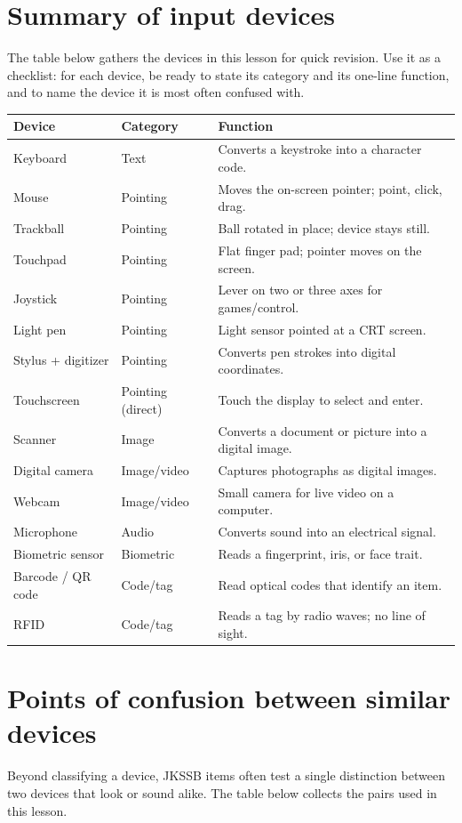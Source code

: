 \section{Summary of input devices}
The table below gathers the devices in this lesson for quick revision. Use it
as a checklist: for each device, be ready to state its category and its
one-line function, and to name the device it is most often confused with.

\begin{center}
\begin{tabular}{p{}p{}p{}}
\toprule
\textbf{Device} & \textbf{Category} & \textbf{Function} \\
\midrule
Keyboard & Text & Converts a keystroke into a character code. \\
Mouse & Pointing & Moves the on-screen pointer; point, click, drag. \\
Trackball & Pointing & Ball rotated in place; device stays still. \\
Touchpad & Pointing & Flat finger pad; pointer moves on the screen. \\
Joystick & Pointing & Lever on two or three axes for games/control. \\
Light pen & Pointing & Light sensor pointed at a CRT screen. \\
Stylus + digitizer & Pointing & Converts pen strokes into digital coordinates. \\
Touchscreen & Pointing (direct) & Touch the display to select and enter. \\
Scanner & Image & Converts a document or picture into a digital image. \\
Digital camera & Image/video & Captures photographs as digital images. \\
Webcam & Image/video & Small camera for live video on a computer. \\
Microphone & Audio & Converts sound into an electrical signal. \\
Biometric sensor & Biometric & Reads a fingerprint, iris, or face trait. \\
Barcode / QR code & Code/tag & Read optical codes that identify an item. \\
RFID & Code/tag & Reads a tag by radio waves; no line of sight. \\
\bottomrule
\end{tabular}
\end{center}

\section{Points of confusion between similar devices}
Beyond classifying a device, JKSSB items often test a single distinction
between two devices that look or sound alike. The table below collects the
pairs used in this lesson.

